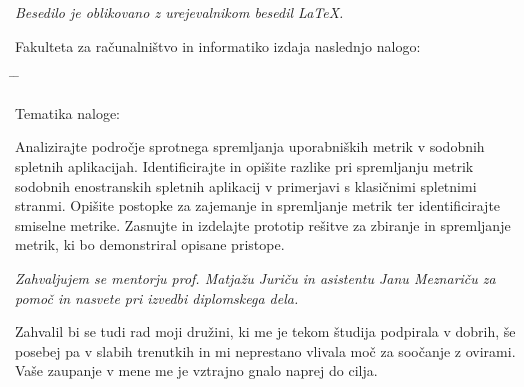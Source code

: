 \documentclass[a4paper, 12pt]{book}
\newcommand{\clearemptydoublepage}{\newpage{\pagestyle{empty}\cleardoublepage}}
\begin{document}
\begin{center}
\mbox{}\vfill
\emph{Besedilo je oblikovano z urejevalnikom besedil \LaTeX.}
\end{center}
\clearemptydoublepage

\thispagestyle{empty}
\vspace*{4cm}

\noindent
Fakulteta za računalništvo in informatiko izdaja naslednjo nalogo:
\medskip
\begin{tabbing}
\hspace{32mm}\= \hspace{6cm} \= \kill




Tematika naloge:
\end{tabbing}
Analizirajte področje sprotnega spremljanja uporabniških metrik v sodobnih spletnih aplikacijah. Identificirajte in opišite razlike pri spremljanju metrik sodobnih enostranskih spletnih aplikacij v primerjavi s klasičnimi spletnimi stranmi. Opišite postopke za zajemanje in spremljanje metrik ter identificirajte smiselne metrike. Zasnujte in izdelajte prototip rešitve za zbiranje in spremljanje metrik, ki bo demonstriral opisane pristope.
\vspace{15mm}






\vspace{2cm}

\clearemptydoublepage

\thispagestyle{empty}\mbox{}\vfill\null\it%
\noindent
Zahvaljujem se mentorju prof. Matjažu Juriču in asistentu Janu Meznariču za pomoč in nasvete pri izvedbi diplomskega dela.

Zahvalil bi se tudi rad moji družini, ki me je tekom študija podpirala v dobrih, še posebej pa v slabih trenutkih in mi neprestano vlivala moč za soočanje z ovirami. Vaše zaupanje v mene me je vztrajno gnalo naprej do cilja.

\rm\normalfont

\clearemptydoublepage


\clearemptydoublepage


\pagestyle{empty}
\def\thepage{}%
\tableofcontents{}
\end{document}
